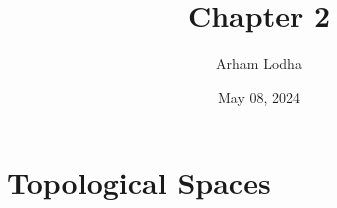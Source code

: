\documentclass{article}
\newcommand{\Z}{\mathbb{Z}}
\newcommand{\N}{\mathbb{N}}
\begin{document}
\title{Chapter 2}
\author{Arham Lodha}%
\date{May 08, 2024}%
\maketitle

\section*{Topological Spaces}



    

    
\end{document}
